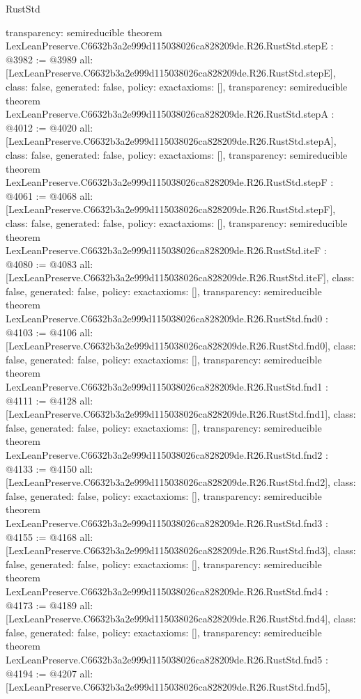 \begin{lexlean}{RustStd}
\begin{coremodule}
{  transparency: semireducible
}
theorem LexLeanPreserve.C6632b3a2e999d115038026ca828209de.R26.RustStd.stepE : @3982 := @3989 {
  all: [LexLeanPreserve.C6632b3a2e999d115038026ca828209de.R26.RustStd.stepE],
  class: false,
  generated: false,
  policy: exact{axioms: []},
  transparency: semireducible
}
theorem LexLeanPreserve.C6632b3a2e999d115038026ca828209de.R26.RustStd.stepA : @4012 := @4020 {
  all: [LexLeanPreserve.C6632b3a2e999d115038026ca828209de.R26.RustStd.stepA],
  class: false,
  generated: false,
  policy: exact{axioms: []},
  transparency: semireducible
}
theorem LexLeanPreserve.C6632b3a2e999d115038026ca828209de.R26.RustStd.stepF : @4061 := @4068 {
  all: [LexLeanPreserve.C6632b3a2e999d115038026ca828209de.R26.RustStd.stepF],
  class: false,
  generated: false,
  policy: exact{axioms: []},
  transparency: semireducible
}
theorem LexLeanPreserve.C6632b3a2e999d115038026ca828209de.R26.RustStd.iteF : @4080 := @4083 {
  all: [LexLeanPreserve.C6632b3a2e999d115038026ca828209de.R26.RustStd.iteF],
  class: false,
  generated: false,
  policy: exact{axioms: []},
  transparency: semireducible
}
theorem LexLeanPreserve.C6632b3a2e999d115038026ca828209de.R26.RustStd.fnd0 : @4103 := @4106 {
  all: [LexLeanPreserve.C6632b3a2e999d115038026ca828209de.R26.RustStd.fnd0],
  class: false,
  generated: false,
  policy: exact{axioms: []},
  transparency: semireducible
}
theorem LexLeanPreserve.C6632b3a2e999d115038026ca828209de.R26.RustStd.fnd1 : @4111 := @4128 {
  all: [LexLeanPreserve.C6632b3a2e999d115038026ca828209de.R26.RustStd.fnd1],
  class: false,
  generated: false,
  policy: exact{axioms: []},
  transparency: semireducible
}
theorem LexLeanPreserve.C6632b3a2e999d115038026ca828209de.R26.RustStd.fnd2 : @4133 := @4150 {
  all: [LexLeanPreserve.C6632b3a2e999d115038026ca828209de.R26.RustStd.fnd2],
  class: false,
  generated: false,
  policy: exact{axioms: []},
  transparency: semireducible
}
theorem LexLeanPreserve.C6632b3a2e999d115038026ca828209de.R26.RustStd.fnd3 : @4155 := @4168 {
  all: [LexLeanPreserve.C6632b3a2e999d115038026ca828209de.R26.RustStd.fnd3],
  class: false,
  generated: false,
  policy: exact{axioms: []},
  transparency: semireducible
}
theorem LexLeanPreserve.C6632b3a2e999d115038026ca828209de.R26.RustStd.fnd4 : @4173 := @4189 {
  all: [LexLeanPreserve.C6632b3a2e999d115038026ca828209de.R26.RustStd.fnd4],
  class: false,
  generated: false,
  policy: exact{axioms: []},
  transparency: semireducible
}
theorem LexLeanPreserve.C6632b3a2e999d115038026ca828209de.R26.RustStd.fnd5 : @4194 := @4207 {
  all: [LexLeanPreserve.C6632b3a2e999d115038026ca828209de.R26.RustStd.fnd5],
}
\end{coremodule}
\end{lexlean}
